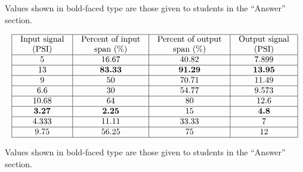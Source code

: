 Values shown in bold-faced type are those given to students in the ``Answer'' section.
\noindent









$$\vbox{\offinterlineskip
\halign{\strut
\vrule \quad\hfil # \ \hfil & 
\vrule \quad\hfil # \ \hfil & 
\vrule \quad\hfil # \ \hfil & 
\vrule \quad\hfil # \ \hfil \vrule \cr
\noalign{\hrule}
%
Input signal & Percent of input & Percent of output & Output signal \cr
%
(PSI) & span (\%) & span (\%) & (PSI) \cr
%
\noalign{\hrule}
%
5 & 16.67 & 40.82 & 7.899 \cr
%
\noalign{\hrule}
%
13 & {\bf 83.33} & {\bf 91.29} & {\bf 13.95} \cr
%
\noalign{\hrule}
%
9 & 50 & 70.71 & 11.49 \cr
%
\noalign{\hrule}
%
6.6 & 30 & 54.77 & 9.573 \cr
%
\noalign{\hrule}
%
10.68 & 64 & 80 & 12.6 \cr
%
\noalign{\hrule}
%
{\bf 3.27} & {\bf 2.25} & 15 & {\bf 4.8} \cr
%
\noalign{\hrule}
%
4.333 & 11.11 & 33.33 & 7 \cr
%
\noalign{\hrule}
%
9.75 & 56.25 & 75 & 12 \cr
%
\noalign{\hrule}
} %
}$$ %

Values shown in bold-faced type are those given to students in the ``Answer'' section.




